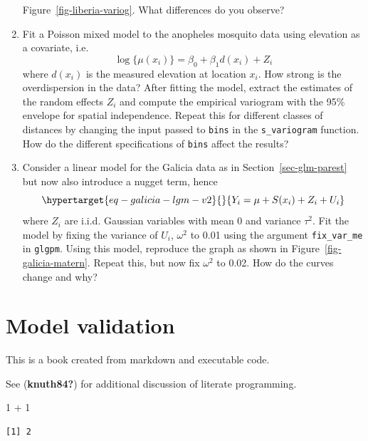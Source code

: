 \documentclass[
  letterpaper,
]{krantz}
\newenvironment{Shaded}{\begin{snugshade}}{\end{snugshade}}
\newcommand{\DecValTok}[1]{\textcolor[rgb]{0.68,0.00,0.00}{#1}}
\newcommand{\SpecialCharTok}[1]{\textcolor[rgb]{0.37,0.37,0.37}{#1}}
\begin{document}
\begin{enumerate}
  Figure~\ref{fig-liberia-variog}. What differences do you observe?
\item
  Fit a Poisson mixed model to the anopheles mosquito data using
  elevation as a covariate, i.e.~\[
  \log\{\mu(x_i)\} = \beta_{0} + \beta_{1} d(x_i) + Z_i
  \] where \(d(x_i)\) is the measured elevation at location \(x_i\). How
  strong is the overdispersion in the data? After fitting the model,
  extract the estimates of the random effects \(Z_i\) and compute the
  empirical variogram with the 95\% envelope for spatial independence.
  Repeat this for different classes of distances by changing the input
  passed to \texttt{bins} in the \texttt{s\_variogram} function. How do
  the different specifications of \texttt{bins} affect the results?
\item
  Consider a linear model for the Galicia data as in
  Section~\ref{sec-glm-parest} but now also introduce a nugget term,
  hence \begin{equation}\protect\hypertarget{eq-galicia-lgm-v2}{}{
  Y_i = \mu + S(x_i) + Z_i + U_i
  }\label{eq-galicia-lgm-v2}\end{equation} where \(Z_i\) are i.i.d.
  Gaussian variables with mean 0 and variance \(\tau^2\). Fit the model
  by fixing the variance of \(U_i\), \(\omega^2\) to 0.01 using the
  argument \texttt{fix\_var\_me} in \texttt{glgpm}. Using this model,
  reproduce the graph as shown in Figure~\ref{fig-galicia-matern}.
  Repeat this, but now fix \(\omega^2\) to 0.02. How do the curves
  change and why?
\end{enumerate}


\hypertarget{sec-validation}{%
\chapter{Model validation}\label{sec-validation}}

This is a book created from markdown and executable code.

See (\textbf{knuth84?}) for additional discussion of literate
programming.

\begin{Shaded}
\begin{Highlighting}[]
\DecValTok{1} \SpecialCharTok{+} \DecValTok{1}
\end{Highlighting}
\end{Shaded}

\begin{verbatim}
[1] 2
\end{verbatim}
\end{document}
